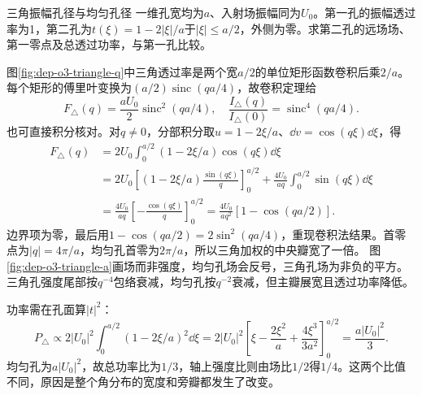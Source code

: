 \begin{example}三角振幅孔径与均匀孔径
一维孔宽均为$a$、入射场振幅同为$U_0$。第一孔的振幅透过率为1，第二孔为$t(\xi)=1-2|\xi|/a$于$|\xi|\leq a/2$，外侧为零。求第二孔的远场场、第一零点及总透过功率，与第一孔比较。
\end{example}
\begin{solution}
图\ref{fig:dep-o3-triangle-q}中三角透过率是两个宽$a/2$的单位矩形函数卷积后乘$2/a$。每个矩形的傅里叶变换为$(a/2)\operatorname{sinc}(qa/4)$，故卷积定理给
\[
 F_\triangle(q)=\frac{aU_0}{2}\operatorname{sinc}^2(qa/4),
 \quad \frac{I_\triangle(q)}{I_\triangle(0)}
 =\operatorname{sinc}^4(qa/4).
\]
也可直接积分核对。对$q\ne0$，分部积分取$u=1-2\xi/a$、$\dd v=\cos(q\xi)\dd\xi$，得
\begin{align*}
 F_\triangle(q)&=2U_0\int_0^{a/2}(1-2\xi/a)\cos(q\xi)\dd\xi\\
 &=2U_0\left[(1-2\xi/a)\frac{\sin(q\xi)}q\right]_0^{a/2}
 +\frac{4U_0}{aq}\int_0^{a/2}\sin(q\xi)\dd\xi\\
 &=\frac{4U_0}{aq}\left[-\frac{\cos(q\xi)}q\right]_0^{a/2}
 =\frac{4U_0}{aq^2}[1-\cos(qa/2)].
\end{align*}
边界项为零，最后用$1-\cos(qa/2)=2\sin^2(qa/4)$，重现卷积法结果。首零点为$|q|=4\pi/a$，均匀孔首零为$2\pi/a$，所以三角加权的中央瓣宽了一倍。
图\ref{fig:dep-o3-triangle-a}画场而非强度，均匀孔场会反号，三角孔场为非负的平方。三角孔强度尾部按$q^{-4}$包络衰减，均匀孔按$q^{-2}$衰减，但主瓣展宽且透过功率降低。

功率需在孔面算$|t|^2$：
\[
 P_\triangle\propto2|U_0|^2\int_0^{a/2}(1-2\xi/a)^2\dd\xi
 =2|U_0|^2\left[\xi-\frac{2\xi^2}{a}+\frac{4\xi^3}{3a^2}\right]_0^{a/2}
 =\frac{a|U_0|^2}{3}.
\]
均匀孔为$a|U_0|^2$，故总功率比为$1/3$，轴上强度比则由场比$1/2$得$1/4$。这两个比值不同，原因是整个角分布的宽度和旁瓣都发生了改变。
\end{solution}
